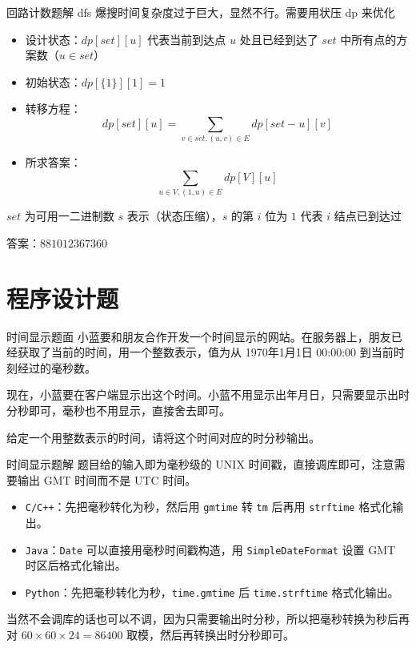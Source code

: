\documentclass{pptt}
\begin{document}
\begin{frame}{回路计数}{题解}
    dfs 爆搜时间复杂度过于巨大，显然不行。需要用状压 dp 来优化

    \begin{itemize}
        \item 设计状态：$dp[set][u]$ 代表当前到达点 $u$ 处且已经到达了 $set$ 中所有点的方案数（$u \in set$）
        \item 初始状态：$dp[\{1\}][1]=1$
        \item 转移方程：$$dp[set][u]=\sum_{v \in set,(u,v) \in E}dp[set-u][v]$$
        \item 所求答案：$$\sum_{u \in V,(1,u) \in E}dp[V][u]$$
    \end{itemize}

    $set$ 为可用一二进制数 $s$ 表示（状态压缩），$s$ 的第 $i$ 位为 $1$ 代表 $i$ 结点已到达过

    答案：$881012367360$
\end{frame}

\section{程序设计题}

\begin{frame}{时间显示}{题面}
    小蓝要和朋友合作开发一个时间显示的网站。在服务器上，朋友已经获取了当前的时间，用一个整数表示，值为从 1970年1月1日 00:00:00 到当前时刻经过的毫秒数。

    现在，小蓝要在客户端显示出这个时间。小蓝不用显示出年月日，只需要显示出时分秒即可，毫秒也不用显示，直接舍去即可。

    给定一个用整数表示的时间，请将这个时间对应的时分秒输出。
\end{frame}

\begin{frame}{时间显示}{题解}
    题目给的输入即为毫秒级的 UNIX 时间戳，直接调库即可，注意需要输出 GMT 时间而不是 UTC 时间。

    \begin{itemize}
        \item \texttt{C/C++}：先把毫秒转化为秒，然后用 \texttt{gmtime} 转 \texttt{tm} 后再用 \texttt{strftime} 格式化输出。
        \item \texttt{Java}：\texttt{Date} 可以直接用毫秒时间戳构造，用 \texttt{SimpleDateFormat} 设置 GMT 时区后格式化输出。
        \item \texttt{Python}：先把毫秒转化为秒，\texttt{time.gmtime} 后 \texttt{time.strftime} 格式化输出。
    \end{itemize}

    当然不会调库的话也可以不调，因为只需要输出时分秒，所以把毫秒转换为秒后再对 $60 \times 60 \times 24=86400$ 取模，然后再转换出时分秒即可。
\end{frame}
\end{document}
